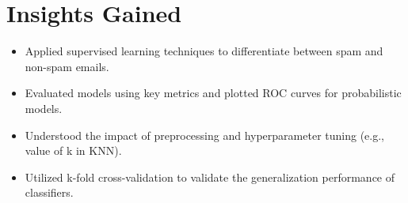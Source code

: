 \documentclass[12pt]{article}
\begin{document}
\section*{Insights Gained}
\begin{itemize}
  \item Applied supervised learning techniques to differentiate between spam and non-spam emails.
  \item Evaluated models using key metrics and plotted ROC curves for probabilistic models.
  \item Understood the impact of preprocessing and hyperparameter tuning (e.g., value of k in KNN).
  \item Utilized k-fold cross-validation to validate the generalization performance of classifiers.
\end{itemize}
\end{document}
